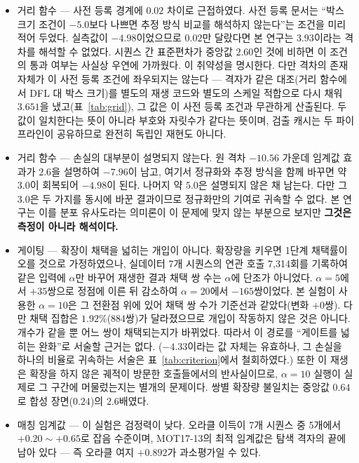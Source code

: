 \documentclass[12pt,a4paper,oneside]{report}
\begin{document}
\begin{itemize}[leftmargin=2em]
\item 거리 함수 --- 사전 등록 경계에 $0.02$ 차이로 근접하였다. 사전 등록 문서는 ``박스 크기 조건이 $-5.0$보다 나쁘면 추정 방식 비교를 해석하지 않는다''는 조건을 미리 적어 두었다. 실측값이 $-4.98$이었으므로 $0.02$만 달랐다면 본 연구는 $3.93$이라는 격차를 해석할 수 없었다. 시퀀스 간 표준편차가 중앙값 $2.60$인 것에 비하면 이 조건의 통과 여부는 사실상 우연에 가까웠다. 이 취약성을 명시한다. 다만 격차의 존재 자체가 이 사전 등록 조건에 좌우되지는 않는다 --- 격자가 같은 대조(거리 함수에서 DFL 대 박스 크기)를 별도의 재생 코드와 별도의 스케일 적합으로 다시 채워 $3.651$을 냈고(표~\ref{tab:grid}), 그 값은 이 사전 등록 조건과 무관하게 산출된다. 두 값이 일치한다는 뜻이 아니라 부호와 자릿수가 같다는 뜻이며, 검출 캐시는 두 파이프라인이 공유하므로 완전히 독립인 재현도 아니다.
\item 거리 함수 --- 손실의 대부분이 설명되지 않는다. 원 격차 $-10.56$ 가운데 임계값 효과가 $2.6$을 설명하여 $-7.96$이 남고, 여기서 정규화와 추정 방식을 함께 바꾸면 약 $3.0$이 회복되어 $-4.98$이 된다. 나머지 약 $5.0$은 설명되지 않은 채 남는다. 다만 그 $3.0$은 두 가지를 동시에 바꾼 결과이므로 정규화만의 기여로 귀속할 수 없다. 본 연구는 이를 분포 유사도라는 의미론이 이 문제에 맞지 않는 부분으로 보지만 \textbf{그것은 측정이 아니라 해석이다.}
\item 게이팅 --- 확장이 채택을 넓히는 개입이 아니다. 확장량을 키우면 1단계 채택률이 오를 것으로 가정하였으나, 실데이터 7개 시퀀스의 연관 호출 7{,}314회를 기록하여 같은 입력에 $\alpha$만 바꾸어 재생한 결과 채택 쌍 수는 $\alpha$에 단조가 아니었다. $\alpha = 5$에서 $+35$쌍으로 정점에 이른 뒤 감소하여 $\alpha = 20$에서 $-165$쌍이었다. 본 실험이 사용한 $\alpha = 10$은 그 전환점 위에 있어 채택 쌍 수가 기준선과 같았다(변화 $+0$쌍). 다만 채택 집합은 $1.92\%$(884쌍)가 달라졌으므로 개입이 작동하지 않은 것은 아니다. 개수가 같을 뿐 어느 쌍이 채택되는지가 바뀌었다. 따라서 이 경로를 ``게이트를 넓히는 완화''로 서술할 근거는 없다. ($-4.33$이라는 값 자체는 유효하나, 그 손실을 하나의 비율로 귀속하는 서술은 표~\ref{tab:criterion}에서 철회하였다.) 또한 이 재생은 확장을 하지 않은 궤적이 방문한 호출들에서의 반사실이므로, $\alpha = 10$ 실행이 실제로 그 구간에 머물렀는지는 별개의 문제이다. 쌍별 확장량 불일치는 중앙값 $0.64$로 합성 장면($0.24$)의 $2.6$배였다.
\item 매칭 임계값 --- 이 실험은 검정력이 낮다. 오라클 이득이 7개 시퀀스 중 5개에서 $+0.20 \sim +0.65$로 잡음 수준이며, MOT17-13의 최적 임계값은 탐색 격자의 끝에 남아 있다 --- 즉 오라클 여지 $+0.892$가 과소평가일 수 있다.

\end{itemize}
\end{document}
